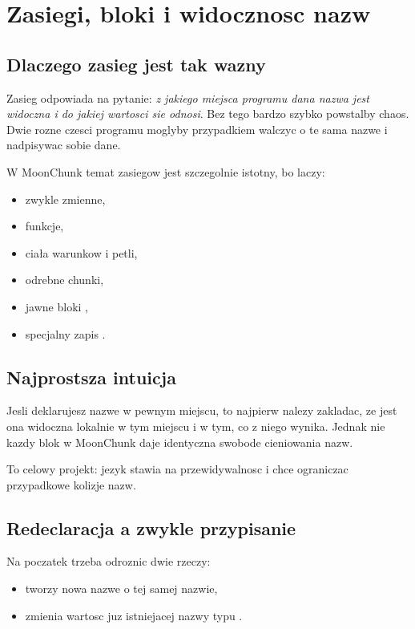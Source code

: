 \chapter{Zasiegi, bloki i widocznosc nazw}

\section{Dlaczego zasieg jest tak wazny}
Zasieg odpowiada na pytanie: \emph{z jakiego miejsca programu dana nazwa jest widoczna
i do jakiej wartosci sie odnosi}. Bez tego bardzo szybko powstalby chaos. Dwie rozne
czesci programu moglyby przypadkiem walczyc o te sama nazwe i nadpisywac sobie dane.

W MoonChunk temat zasiegow jest szczegolnie istotny, bo laczy:

\begin{itemize}
  \item zwykle zmienne,
  \item funkcje,
  \item ciała warunkow i petli,
  \item odrebne chunki,
  \item jawne bloki ,
  \item specjalny zapis .
\end{itemize}

\section{Najprostsza intuicja}
Jesli deklarujesz nazwe w pewnym miejscu, to najpierw nalezy zakladac, ze jest ona
widoczna lokalnie w tym miejscu i w tym, co z niego wynika. Jednak nie kazdy blok w
MoonChunk daje identyczna swobode cieniowania nazw.

To celowy projekt: jezyk stawia na przewidywalnosc i chce ograniczac przypadkowe
kolizje nazw.

\section{Redeclaracja a zwykle przypisanie}
Na poczatek trzeba odroznic dwie rzeczy:

\begin{itemize}
  \item {} tworzy nowa nazwe o tej samej nazwie,
  \item {} zmienia wartosc juz istniejacej nazwy typu .
\end{itemize}

